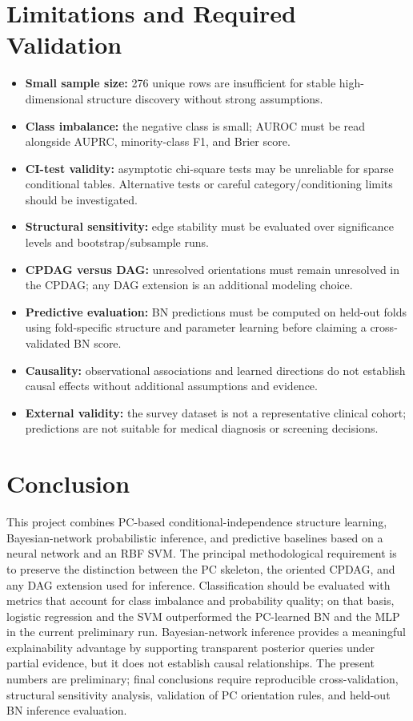 \documentclass[10pt,twocolumn,letterpaper]{article}
\begin{document}
	\section{Limitations and Required Validation}
	\begin{itemize}
		\item \textbf{Small sample size:} 276 unique rows are insufficient for stable high-dimensional structure discovery without strong assumptions.
		\item \textbf{Class imbalance:} the negative class is small; AUROC must be read alongside AUPRC, minority-class F1, and Brier score.
		\item \textbf{CI-test validity:} asymptotic chi-square tests may be unreliable for sparse conditional tables. Alternative tests or careful category/conditioning limits should be investigated.
		\item \textbf{Structural sensitivity:} edge stability must be evaluated over significance levels and bootstrap/subsample runs.
		\item \textbf{CPDAG versus DAG:} unresolved orientations must remain unresolved in the CPDAG; any DAG extension is an additional modeling choice.
		\item \textbf{Predictive evaluation:} BN predictions must be computed on held-out folds using fold-specific structure and parameter learning before claiming a cross-validated BN score.
		\item \textbf{Causality:} observational associations and learned directions do not establish causal effects without additional assumptions and evidence.
		\item \textbf{External validity:} the survey dataset is not a representative clinical cohort; predictions are not suitable for medical diagnosis or screening decisions.
	\end{itemize}

	\section{Conclusion}
	This project combines PC-based conditional-independence structure learning, Bayesian-network probabilistic inference, and predictive baselines based on a neural network and an RBF SVM. The principal methodological requirement is to preserve the distinction between the PC skeleton, the oriented CPDAG, and any DAG extension used for inference. Classification should be evaluated with metrics that account for class imbalance and probability quality; on that basis, logistic regression and the SVM outperformed the PC-learned BN and the MLP in the current preliminary run. Bayesian-network inference provides a meaningful explainability advantage by supporting transparent posterior queries under partial evidence, but it does not establish causal relationships. The present numbers are preliminary; final conclusions require reproducible cross-validation, structural sensitivity analysis, validation of PC orientation rules, and held-out BN inference evaluation.
\end{document}
